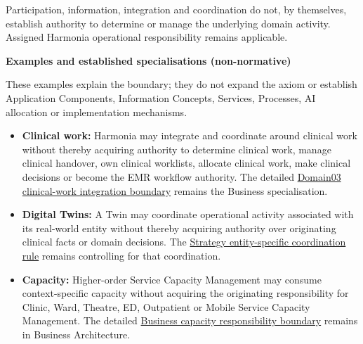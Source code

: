 Participation, information, integration and coordination do not, by
themselves, establish authority to determine or manage the underlying domain
activity. Assigned Harmonia operational responsibility remains applicable.



\par\medskip\textbf{Examples and established specialisations (non-normative)}\par


These examples explain the boundary; they do not expand the axiom or
establish Application Components, Information Concepts, Services, Processes,
AI allocation or implementation mechanisms.



\begin{itemize}


\item \textbf{Clinical work:} Harmonia may integrate and coordinate around clinical work
  without thereby acquiring authority to determine clinical work, manage
  clinical handover, own clinical worklists, allocate clinical work, make
  clinical decisions or become the EMR workflow authority. The detailed
  \href{\detokenize{../../../../../docs/markdown/03-business-architecture/metamodel/business-architecture-metamodel.md#37-clinical-work-integration-boundary}}{Domain03 clinical-work integration boundary}
  remains the Business specialisation.

\item \textbf{Digital Twins:} A Twin may coordinate operational activity associated
  with its real-world entity without thereby acquiring authority over
  originating clinical facts or domain decisions. The
  \href{\detokenize{../../../../../docs/markdown/02-strategy/strategic-views/logical-component-responsibilities.md#entity-specific-operational-coordination}}{Strategy entity-specific coordination rule}
  remains controlling for that coordination.

\item \textbf{Capacity:} Higher-order Service Capacity Management may consume
  context-specific capacity without acquiring the originating responsibility
  for Clinic, Ward, Theatre, ED, Outpatient or Mobile Service Capacity
  Management. The detailed
  \href{\detokenize{../../../../../docs/markdown/03-business-architecture/behaviours/04-health-service-operations.md#capacity-management-responsibility-boundary}}{Business capacity responsibility boundary}
  remains in Business Architecture.


\end{itemize}
